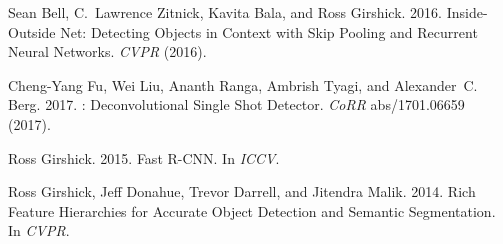 \documentclass[sigconf]{acmart}
\begin{document}
\begin{thebibliography}{13}



\ifx \showCODEN    \undefined {}     \fi
\ifx \showDOI      \undefined \def \showDOI       #1{#1}\fi
\ifx \showISBNx    \undefined \def \showISBNx     #1{\unskip}     \fi
\ifx \showISBNxiii \undefined \def \showISBNxiii  #1{\unskip}     \fi
\ifx \showISSN     \undefined \def \showISSN      #1{\unskip}     \fi
\ifx \showLCCN     \undefined \def \showLCCN      #1{\unskip}     \fi
\ifx \shownote     \undefined \def \shownote      #1{#1}          \fi
\ifx \showarticletitle \undefined \def \showarticletitle #1{#1}   \fi
\ifx \showURL      \undefined \def \showURL       {\relax}        \fi
\providecommand\bibfield[2]{#2}
\providecommand\bibinfo[2]{#2}
\providecommand\natexlab[1]{#1}
\providecommand\showeprint[2][]{arXiv:#2}

\bibfield{author}{\bibinfo{person}{Sean Bell}, \bibinfo{person}{C.~Lawrence
  Zitnick}, \bibinfo{person}{Kavita Bala}, {and} \bibinfo{person}{Ross
  Girshick}.} \bibinfo{year}{2016}\natexlab{}.
\newblock \showarticletitle{Inside-Outside Net: Detecting Objects in Context
  with Skip Pooling and Recurrent Neural Networks}.
\newblock \bibinfo{journal}{\emph{CVPR}} (\bibinfo{year}{2016}).
\newblock


\bibfield{author}{\bibinfo{person}{Cheng{-}Yang Fu}, \bibinfo{person}{Wei Liu},
  \bibinfo{person}{Ananth Ranga}, \bibinfo{person}{Ambrish Tyagi}, {and}
  \bibinfo{person}{Alexander~C. Berg}.} \bibinfo{year}{2017}\natexlab{}.
\newblock \showarticletitle{{DSSD} : Deconvolutional Single Shot Detector}.
\newblock \bibinfo{journal}{\emph{CoRR}}  \bibinfo{volume}{abs/1701.06659}
  (\bibinfo{year}{2017}).
\newblock


\bibfield{author}{\bibinfo{person}{Ross Girshick}.}
  \bibinfo{year}{2015}\natexlab{}.
\newblock \showarticletitle{Fast R-CNN}. In \bibinfo{booktitle}{\emph{ICCV}}.
\newblock


\bibfield{author}{\bibinfo{person}{Ross Girshick}, \bibinfo{person}{Jeff
  Donahue}, \bibinfo{person}{Trevor Darrell}, {and} \bibinfo{person}{Jitendra
  Malik}.} \bibinfo{year}{2014}\natexlab{}.
\newblock \showarticletitle{Rich Feature Hierarchies for Accurate Object
  Detection and Semantic Segmentation}. In \bibinfo{booktitle}{\emph{CVPR}}.
\newblock



\end{thebibliography}
\end{document}
